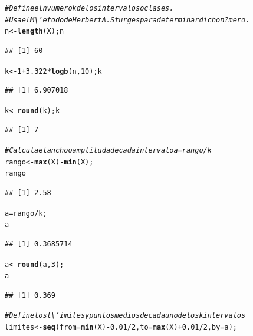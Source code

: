 \documentclass[12pt,letterpaper]{article}\usepackage[]{graphicx}\usepackage[]{color}
\makeatletter
\newcommand{\hlnum}[1]{\textcolor[rgb]{0.686,0.059,0.569}{#1}}%
\newcommand{\hlcom}[1]{\textcolor[rgb]{0.678,0.584,0.686}{\textit{#1}}}%
\newcommand{\hlopt}[1]{\textcolor[rgb]{0,0,0}{#1}}%
\newcommand{\hlstd}[1]{\textcolor[rgb]{0.345,0.345,0.345}{#1}}%
\newcommand{\hlkwb}[1]{\textcolor[rgb]{0.69,0.353,0.396}{#1}}%
\newcommand{\hlkwc}[1]{\textcolor[rgb]{0.333,0.667,0.333}{#1}}%
\newcommand{\hlkwd}[1]{\textcolor[rgb]{0.737,0.353,0.396}{\textbf{#1}}}%
\newenvironment{kframe}{%
 \def\at@end@of@kframe{}%
 \ifinner\ifhmode%
  \def\at@end@of@kframe{\end{minipage}}%
  \begin{minipage}{\columnwidth}%
 \fi\fi%
 \def\FrameCommand##1{\hskip\@totalleftmargin \hskip-\fboxsep
 \colorbox{shadecolor}{##1}\hskip-\fboxsep
     \hskip-\linewidth \hskip-\@totalleftmargin \hskip\columnwidth}%
 \MakeFramed {\advance\hsize-\width
   \@totalleftmargin\z@ \linewidth\hsize
   \@setminipage}}%
 {\par\unskip\endMakeFramed%
 \at@end@of@kframe}
\newenvironment{knitrout}{}{} %
\makeatother
\begin{document}
\begin{knitrout}
\color{fgcolor}\begin{kframe}
\begin{alltt}
\hlcom{# Define el nvumero k de los intervalos o clases.}
\hlcom{# Usa el M\textbackslash{}'etodo de Herbert A. Sturges para determinar dicho n?mero.}
\hlstd{n} \hlkwb{<-} \hlkwd{length}\hlstd{(X); n}
\end{alltt}
\begin{verbatim}
## [1] 60
\end{verbatim}
\begin{alltt}
\hlstd{k} \hlkwb{<-} \hlnum{1}\hlopt{+}\hlnum{3.322}\hlopt{*}\hlkwd{logb}\hlstd{(n,} \hlnum{10}\hlstd{); k}
\end{alltt}
\begin{verbatim}
## [1] 6.907018
\end{verbatim}
\begin{alltt}
\hlstd{k} \hlkwb{<-} \hlkwd{round}\hlstd{(k); k}
\end{alltt}
\begin{verbatim}
## [1] 7
\end{verbatim}
\begin{alltt}
\hlcom{# Calcula el ancho o amplitud a de cada intervalo a=rango/k}
\hlstd{rango} \hlkwb{<-} \hlkwd{max}\hlstd{(X)}\hlopt{-}\hlkwd{min}\hlstd{(X);}
\hlstd{rango}
\end{alltt}
\begin{verbatim}
## [1] 2.58
\end{verbatim}
\begin{alltt}
\hlstd{a}\hlkwb{=}\hlstd{rango}\hlopt{/}\hlstd{k;}
\hlstd{a}
\end{alltt}
\begin{verbatim}
## [1] 0.3685714
\end{verbatim}
\begin{alltt}
\hlstd{a} \hlkwb{<-} \hlkwd{round}\hlstd{(a,} \hlnum{3}\hlstd{);}
\hlstd{a}
\end{alltt}
\begin{verbatim}
## [1] 0.369
\end{verbatim}
\begin{alltt}
\hlcom{# Define los l\textbackslash{}'imites y puntos medios de cada uno de los k intervalos}
\hlstd{limites} \hlkwb{<-} \hlkwd{seq}\hlstd{(}\hlkwc{from}\hlstd{=}\hlkwd{min}\hlstd{(X)}\hlopt{-}\hlnum{0.01}\hlopt{/}\hlnum{2}\hlstd{,} \hlkwc{to}\hlstd{=}\hlkwd{max}\hlstd{(X)}\hlopt{+}\hlnum{0.01}\hlopt{/}\hlnum{2}\hlstd{,} \hlkwc{by}\hlstd{=a);}

\end{alltt}
\end{kframe}
\end{knitrout}
\end{document}
